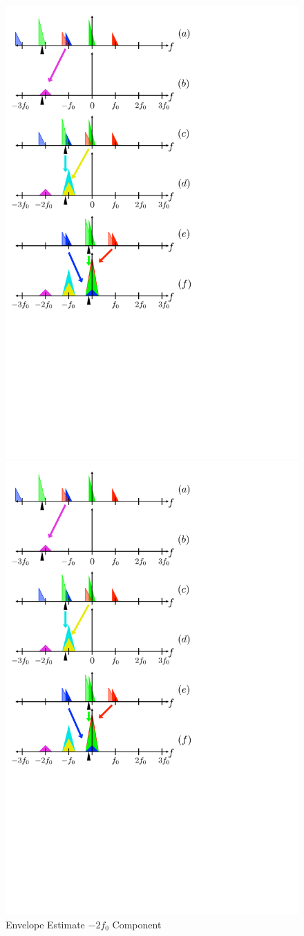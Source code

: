 \documentclass [11pt, proquest,oneside] {ganter_thesis}[2015/03/03]
\begin{document}
\begin{figure}[!ht]
   \centering
    \includegraphics[width=.62\textwidth]{harmonic_envelope_2F0}   
    \caption{Envelope Estimate $-2f_0$ Component}\label{fig:harmonic_envelope_2F0}
    \includegraphics[width=.62\textwidth]{harmonic_envelope_F0} 

\end{figure}
\end{document}
